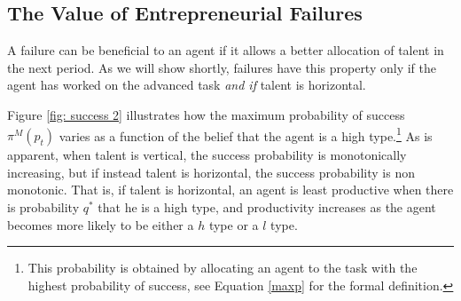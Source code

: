 \documentclass[12pt,american]{paper}
\theoremstyle{remark}
\begin{document}
\subsection{The Value of Entrepreneurial Failures}
A failure can be beneficial to an agent if it allows a better allocation of talent in the next period. As we will show shortly, failures have this property only if the agent has worked on the advanced task  \textit{and if} talent is horizontal. 

 Figure \ref{fig: success 2} illustrates how the maximum probability of success $\pi^M(p_t)$  varies as a function of the belief that the agent is a high type.\footnote{This probability is obtained by allocating an agent to the task with the highest probability of success, see Equation \ref{maxp} for the formal definition.} As is apparent,  when talent is vertical, the success probability is monotonically increasing, but if instead talent is horizontal, the success probability is non monotonic. That is, if talent is horizontal, an agent is least productive when there is probability $q^*$ that he is a high type, and productivity increases as the agent becomes more likely to be either a $h$ type or a $l$ type. 
\end{document}
